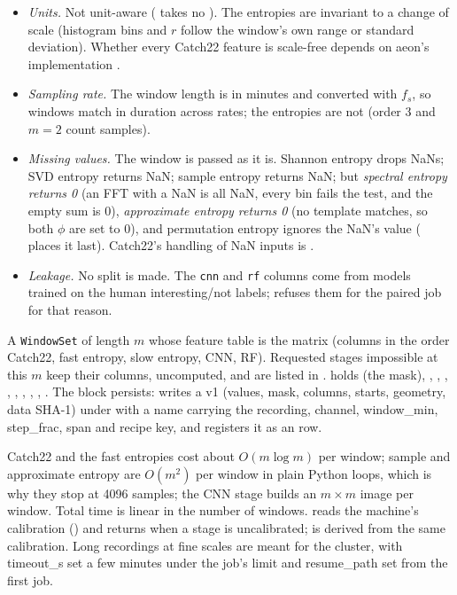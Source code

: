 \begin{itemize}
\item \emph{Units.} Not unit-aware ( takes no ). The entropies are
  invariant to a change of scale (histogram bins and $r$ follow the window's own range or
  standard deviation). Whether every Catch22 feature is scale-free depends on aeon's
  implementation .
\item \emph{Sampling rate.} The window length is in minutes and converted with $f_s$, so
  windows match in duration across rates; the entropies are not (order 3 and $m = 2$ count
  samples).
\item \emph{Missing values.} The window is passed as it is. Shannon entropy drops NaNs; SVD
  entropy returns NaN; sample entropy returns NaN; but \emph{spectral entropy returns 0} (an
  FFT with a NaN is all NaN, every bin fails the  test, and the empty sum is
  0), \emph{approximate entropy returns 0} (no template matches, so both $\phi$ are set to 0),
  and permutation entropy ignores the NaN's value ( places it last). Catch22's
  handling of NaN inputs is .
\item \emph{Leakage.} No split is made. The \texttt{cnn} and \texttt{rf} columns come from
  models trained on the human interesting/not labels; 
  refuses them for the paired job for that reason.
\end{itemize}

A \texttt{WindowSet} of length $m$ whose feature table is the matrix (columns in the order
Catch22, fast entropy, slow entropy, CNN, RF). Requested stages impossible at this $m$ keep
their columns, uncomputed, and are listed in .  holds
 (the mask), , , , ,
, , , , .
The block persists:  writes a v1  (values, mask, columns, starts,
geometry, data SHA-1) under  with a name carrying the recording, channel,
window\_min, step\_frac, span and recipe key, and registers it as an
 row.

Catch22 and the fast entropies cost about $O(m\log m)$ per window; sample and approximate
entropy are $O(m^2)$ per window in plain Python loops, which is why they stop at 4096 samples;
the CNN stage builds an $m\times m$ image per window. Total time is linear in the number of
windows.  reads the machine's calibration () and
returns  when a stage is uncalibrated;  is derived from the
same calibration. Long recordings at fine scales are meant for the cluster, with timeout\_s set
a few minutes under the job's limit and resume\_path set from the first job.

